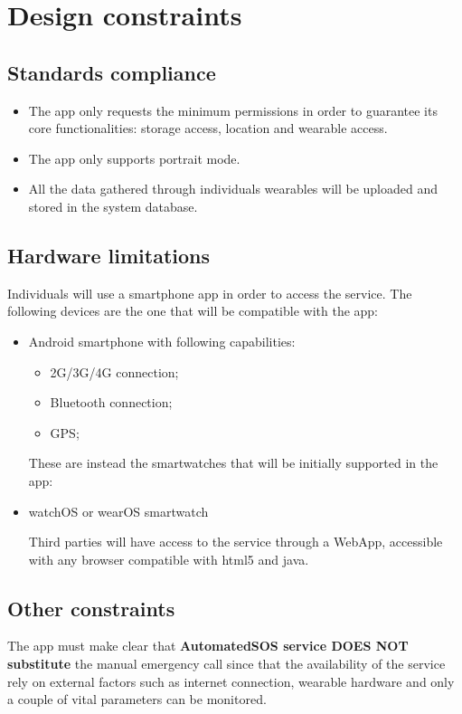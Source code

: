 \section{Design constraints}
\subsection{Standards compliance}
\begin{itemize}
\item The app only requests the minimum permissions in order to guarantee its core functionalities: storage access, location and wearable access.
\item The app only supports portrait mode.
\item All the data gathered through individuals wearables will be uploaded and stored in the system database.
\end{itemize}


\subsection{Hardware limitations}
Individuals will use a smartphone app in order to access the service.
The following devices are the one that will be compatible with the app:
\begin{itemize}
\item Android smartphone with following capabilities:
\begin{itemize}
\item 2G/3G/4G connection;
\item Bluetooth connection;
\item GPS;
\end{itemize}

These are instead the smartwatches that will be initially supported in the app:
\item watchOS or wearOS smartwatch


Third parties will have access to the service through a WebApp, accessible with any browser compatible with html5 and java.
\end{itemize}

\subsection{Other constraints}
The app must make clear that \textbf{AutomatedSOS service DOES NOT substitute} the manual emergency call since that the availability of the service rely on external factors such as internet connection, wearable hardware and only a couple of vital parameters can be monitored.


